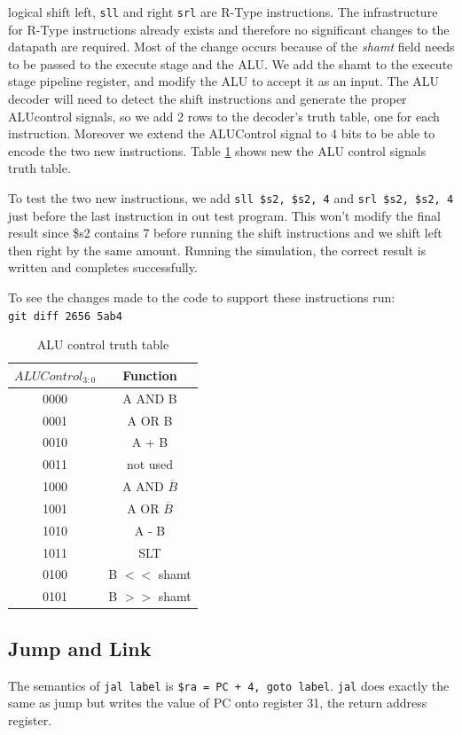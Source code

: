 \documentclass[titlepage,12pt,oneside,a4paper]{article}
\newcommand{\code}[1]{{\texttt{#1}}}
\begin{document}
logical shift left, \code{sll} and right \code{srl} are R-Type instructions. The infrastructure for R-Type instructions already exists and therefore no significant changes to the datapath are required. Most of the change occurs because of the \textit{shamt} field needs to be passed to the execute stage and the ALU. We add the shamt to the execute stage pipeline register, and modify the ALU to accept it as an input. The ALU decoder will need to detect the shift instructions and generate the proper ALUcontrol signals, so we add 2 rows to the decoder's truth table, one for each instruction. Moreover we extend the ALUControl signal to 4 bits to be able to encode the two new instructions. Table \ref{table:aluctrl} shows new the ALU control signals truth table.

To test the two new instructions, we add \code{sll \$s2, \$s2, 4} and \code{srl \$s2, \$s2, 4} just before the last instruction in out test program. This won't modify the final result since \$s2 contains 7 before running the shift instructions and we shift left then right by the same amount. Running the simulation, the correct result is written and completes successfully.

To see the changes made to the code to support these instructions run:\\
\code{git diff 2656 5ab4} 
\begin{table}
\begin{center}
	
	\begin{tabular}{|c|c|}
		\hline
		$ALUControl_{3:0}$ & Function \\
		\hline
		0000 & A AND B \\
		0001 & A OR B \\
		0010 & A + B \\
		0011 & not used \\
		1000 & A AND $\overline{B}$ \\
		1001 & A OR $\overline{B}$ \\
		1010 & A - B \\
		1011 & SLT \\
		0100 & B $<<$ shamt \\
		0101 & B $>>$ shamt \\
		\hline
	\end{tabular}
\end{center}
	\caption{ALU control truth table}
	\label{table:aluctrl}
\end{table}


\subsection{Jump and Link}
The semantics of \code{jal label} is \code{\$ra = PC + 4, goto label}. \code{jal} does exactly the same as jump but writes the value of PC onto register 31, the return address register.
\end{document}

